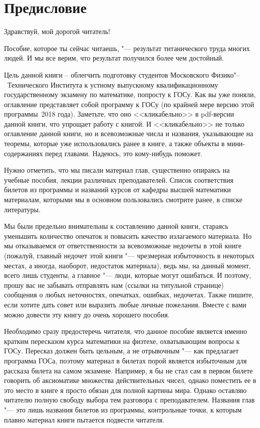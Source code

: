 \chapter{Предисловие}

\begin{center} 
	Здравствуй, мой дорогой читатель!
\end{center}

Пособие, которое ты сейчас читаешь, "--- результат титанического труда многих людей. И мы все верим, что результат получился более чем достойный. 

Цель данной книги – облегчить подготовку студентов Московского Физико"--~Технического Института к устному выпускному квалификационному государственному экзамену по математике, попросту к ГОСу. Как вы уже поняли, оглавление представляет собой программу к ГОСу (по крайней мере версию этой программы~2018 года). Заметьте, что оно <<кликабельно>> в pdf-версии данной книги, что упрощает работу с книгой. И <<кликабельно>> не только оглавление данной книги, но и всевозможные числа и названия, указывающие на теоремы, которые уже использовались ранее в книге, а также объекты в мини-содержаниях перед главами. Надеюсь, это кому-нибудь поможет. 

Нужно отметить, что мы писали материал глав, существенно опираясь на учебные пособия, лекции различных преподавателей. Список соответствия билетов из программы и названий курсов от кафедры высшей математики материалам, которыми мы в основном пользовались смотрите ранее, в списке литературы.

Мы были предельно внимательны к составлению данной книги, стараясь уменьшить количество опечаток и повысить качество излагаемого материала. Но мы отказываемся от ответственности за всевозможные недочеты в этой книге (пожалуй, главный недочет этой книги "--- чрезмерная избыточность в некоторых местах, а иногда, наоборот, недостаток материала), ведь мы, на данный момент, всего лишь студенты, а главное "--- люди, которые могут ошибаться. И поэтому, прошу вас не забывать отправлять нам (ссылки на титульной странице) сообщения о любых неточностях, опечатках, ошибках, недочетах. Также пишите, если хотите дать совет или выразить любые личные пожелания. Вместе с вами можно довести эту книгу до очень хорошего пособия.

Необходимо сразу предостеречь читателя, что данное пособие является именно кратким пересказом курса математики на физтехе, охватывающим вопросы к ГОСу. Пересказ должен быть цельным, а не отрывочным "--- как предлагает программа ГОСа, поэтому материал в билетах порой является избыточным для рассказа билета на самом экзамене. Например, я бы не стал сам в первом билете говорить об аксиоматике множества действительных чисел, однако поместить ее в это место в книге я просто обязан для полной картины мира. Однако оставляю читателю полную свободу выбора тем разговора с преподавателем. Названия глав "--- это лишь названия билетов из программы, контрольные точки, к которым плавно материал книги пытается подвести читателя.

